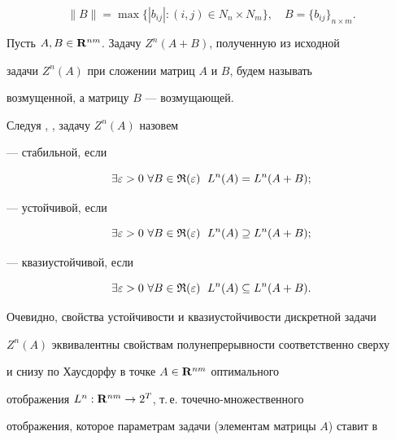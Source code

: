 $$ 


\|B\|=\max\{|b_{ij}|:(i,j)\in N_n\times N_m\},\quad 


B=\{b_{ij}\}_{n\times m}. 


$$ 


 


Пусть $A,B\in\bold R^{nm}$. Задачу $Z^n(A+B)$, полученную из исходной 


задачи $Z^n(A)$ при сложении матриц $A$ и $B$, будем называть 


возмущенной, а матрицу $B$ --- возмущающей. 


 


Следуя \cite{12}, \cite{13}, задачу $Z^n(A)$ назовем 


 


--- стабильной, если 


$$ 


\exists \varepsilon>0 \ \forall B\in\frak R(\varepsilon)\ \; 


L^n(A)=L^n(A+B); 


$$ 


 


--- устойчивой, если 


$$ 


\exists\varepsilon>0 \ \forall B\in\frak R(\varepsilon)\ \; 


L^n(A)\supseteq L^n(A+B); 


$$ 


 


--- квазиустойчивой, если 


$$ 


\exists\varepsilon>0 \ \forall B\in\frak R(\varepsilon)\ \; 


L^n(A)\subseteq L^n(A+B). 


$$ 


 


Очевидно, свойства устойчивости и квазиустойчивости дискретной задачи 


$Z^n(A)$ эквивалентны свойствам полунепрерывности соответственно сверху 


и снизу по Хаусдорфу в точке $A\in\bold R^{nm}$ оптимального 


отображения $L^n:\bold R^{nm}\to 2^T$, т.\,е.{} точечно-множественного 


отображения, которое параметрам задачи (элементам матрицы $A$) ставит в 


